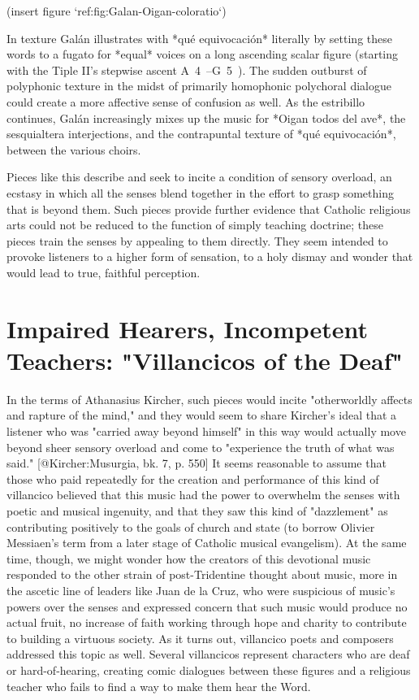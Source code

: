 (insert figure `ref:fig:Galan-Oigan-coloratio`)
\label{fig:Galan-Oigan-coloratio}

In texture Galán illustrates with *qué equivocación* literally by setting these words
to a fugato for *equal* voices on a long ascending scalar figure (starting with
the Tiple II's stepwise ascent A~4~--G~5~). 
The sudden outburst of polyphonic texture in the midst of primarily homophonic
polychoral dialogue could create a more affective sense of confusion as well. 
As the estribillo continues, Galán increasingly mixes up the music for *Oigan
todos del ave*, the sesquialtera interjections, and the contrapuntal texture of
*qué equivocación*, between the various choirs. 

Pieces like this describe and seek to incite a condition of sensory overload, an
ecstasy in which all the senses blend together in the effort to grasp something
that is beyond them.
Such pieces provide further evidence that Catholic religious arts could not be
reduced to the function of simply teaching doctrine; these pieces train the
senses by appealing to them directly. 
They seem intended to provoke listeners to a higher form of sensation, to a holy
dismay and wonder that would lead to true, faithful perception.


\section{Impaired Hearers, Incompetent Teachers: "Villancicos of the Deaf"}

In the terms of Athanasius Kircher, such pieces would incite
"otherworldly affects and rapture of the mind," and they would seem to share
Kircher's ideal that a listener who was "carried away beyond himself" in this
way would actually move beyond sheer sensory overload and come to "experience
the truth of what was said."
[@Kircher:Musurgia, bk. 7, p. 550] 
It seems reasonable to assume that those who paid repeatedly for the creation
and performance of this kind of villancico believed that this music had the
power to overwhelm the senses with poetic and musical ingenuity, and that they
saw this kind of "dazzlement" as contributing positively to the goals of church
and state (to borrow Olivier Messiaen's term from a later stage of Catholic
musical evangelism).
At the same time, though, we might wonder how the creators of this devotional
music responded to the other strain of post-Tridentine thought about music, more
in the ascetic line of leaders like Juan de la Cruz, who were suspicious of
music's powers over the senses and expressed concern that such music would
produce no actual fruit, no increase of faith working through hope and charity
to contribute to building a virtuous society.
As it turns out, villancico poets and composers addressed this topic as well.
Several villancicos represent characters who are deaf or hard-of-hearing,
creating comic dialogues between these figures and a religious teacher who fails
to find a way to make them hear the Word.


